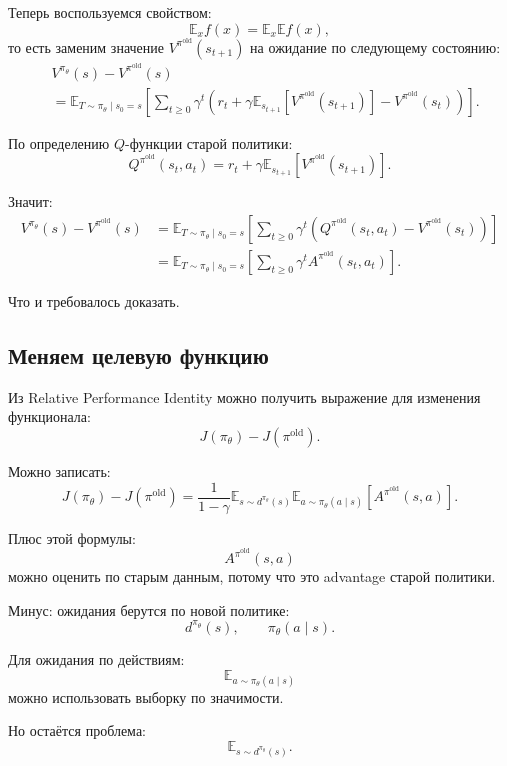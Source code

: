 \documentclass[12pt,a4paper]{article}
\begin{document}
Теперь воспользуемся свойством:
\[
\mathbb E_x f(x)
=
\mathbb E_x \mathbb E f(x),
\]
то есть заменим значение $V^{\pi^{\mathrm{old}}}(s_{t+1})$ на ожидание по следующему состоянию:
\[
\begin{aligned}
&
V^{\pi_\theta}(s)
-
V^{\pi^{\mathrm{old}}}(s)
\\
&=
\mathbb E_{T\sim\pi_\theta\mid s_0=s}
\left[
\sum_{t\ge 0}
\gamma^t
\left(
r_t
+
\gamma
\mathbb E_{s_{t+1}}
\left[
V^{\pi^{\mathrm{old}}}(s_{t+1})
\right]
-
V^{\pi^{\mathrm{old}}}(s_t)
\right)
\right].
\end{aligned}
\]

По определению $Q$-функции старой политики:
\[
Q^{\pi^{\mathrm{old}}}(s_t,a_t)
=
r_t
+
\gamma
\mathbb E_{s_{t+1}}
\left[
V^{\pi^{\mathrm{old}}}(s_{t+1})
\right].
\]

Значит:
\[
\begin{aligned}
V^{\pi_\theta}(s)
-
V^{\pi^{\mathrm{old}}}(s)
&=
\mathbb E_{T\sim\pi_\theta\mid s_0=s}
\left[
\sum_{t\ge 0}
\gamma^t
\left(
Q^{\pi^{\mathrm{old}}}(s_t,a_t)
-
V^{\pi^{\mathrm{old}}}(s_t)
\right)
\right]
\\
&=
\mathbb E_{T\sim\pi_\theta\mid s_0=s}
\left[
\sum_{t\ge 0}
\gamma^t
A^{\pi^{\mathrm{old}}}(s_t,a_t)
\right].
\end{aligned}
\]

Что и требовалось доказать.

\subsection{Меняем целевую функцию}

Из Relative Performance Identity можно получить выражение для изменения функционала:
\[
J(\pi_\theta)-J(\pi^{\mathrm{old}}).
\]

Можно записать:
\[
J(\pi_\theta)
-
J(\pi^{\mathrm{old}})
=
\frac{1}{1-\gamma}
\mathbb E_{s\sim d^{\pi_\theta}(s)}
\mathbb E_{a\sim \pi_\theta(a\mid s)}
\left[
A^{\pi^{\mathrm{old}}}(s,a)
\right].
\]

Плюс этой формулы:
\[
A^{\pi^{\mathrm{old}}}(s,a)
\]
можно оценить по старым данным, потому что это advantage старой политики.

Минус: ожидания берутся по новой политике:
\[
d^{\pi_\theta}(s),
\qquad
\pi_\theta(a\mid s).
\]

Для ожидания по действиям:
\[
\mathbb E_{a\sim\pi_\theta(a\mid s)}
\]
можно использовать выборку по значимости.

Но остаётся проблема:
\[
\mathbb E_{s\sim d^{\pi_\theta}(s)}.
\]
\end{document}
